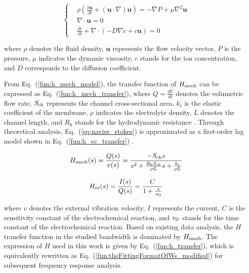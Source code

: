 \documentclass[journal]{IEEEtran}
\newcommand{\kr}{k_{\text{r}}} %
\begin{document}
\begin{equation}
    \left\{
    \begin{aligned}
         & \rho \left( \frac{\partial \mathbf{u}}{\partial t} + (\mathbf{u} \cdot \nabla) \mathbf{u} \right) = -\nabla P + \mu \nabla^2 \mathbf{u} \\
         & \nabla \cdot \mathbf{u} = 0                                                                                                             \\
         & \frac{\partial c}{\partial t} + \nabla \cdot \left(-D \nabla c + c \mathbf{u}\right) = 0
    \end{aligned}
    \label{eq:navier_stokes}
    \right.
\end{equation}


where $\rho$ denotes the fluid density, $\mathbf{u}$ represents the flow velocity vector, $P$ is the pressure, $\mu$ indicates the dynamic viscosity, $c$ stands for the ion concentration, and $D$ corresponds to the diffusion coefficient.



From Eq.~(\ref{fun:h_mech_model}), the transfer function of $H_{\rm mech}$ can be expressed as Eq.~(\ref{fun:h_mech_transfer}), where $ Q = \frac{dV}{dt} $ denotes the volumetric flow rate, $ S_{\rm ch} $ represents the channel cross-sectional area, $ \kr $ is the elastic coefficient of the membrane, $ \rho $ indicates the electrolyte density, $ L $ denotes the channel length, and $ R_{\text{h}} $ stands for the hydrodynamic resistance \cite{agafonov2015}.
Through theoretical analysis, Eq.~(\ref{eq:navier_stokes}) is approximated as a first-order lag model shown in Eq.~(\ref{fun:h_ec_transfer}) \cite{WOS:000318036400036}.




\begin{equation}
    H_{\rm mech}(s)  = \frac{Q(s)}{v(s)} = \frac{- S_{\rm ch} s}{s^2 + \frac{R_{\text{h}} S_{\rm ch}}{\rho L}s + \frac{\kr}{\rho L }}
    \label{fun:h_mech_transfer}
\end{equation}

\begin{equation}
    H_{\rm{ec}}(s) = \frac{I(s)}{Q(s)} = \frac{C}{1 + \frac{s}{s_{\rm{D}}}}
    \label{fun:h_ec_transfer}
\end{equation}


where $ v $ denotes the external vibration velocity, $ I $ represents the current, $ C $ is the sensitivity constant of the electrochemical reaction, and $ s_{\rm{D}} $ stands for the time constant of the electrochemical reaction.
Based on existing data analysis, the $ H $ transfer function in the studied bandwidth is dominated by $ H_{\rm mech} $. The expression of $ H $ used in this work is given by Eq.~(\ref{fun:h_transfer}), which is equivalently rewritten as Eq.~(\ref{fun:theFittingFormatOfWs_modified}) for subsequent frequency response analysis.
\end{document}
